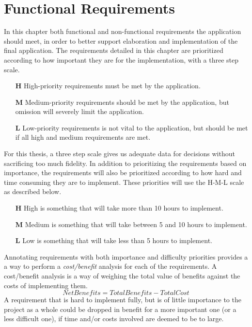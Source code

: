 \chapter{Functional Requirements}
\label{cha:funcreq}
In this chapter both functional and non-functional requirements the application should meet, in order to better support elaboration and implementation of the final application. 
The requirements detailed in this chapter are prioritized according to how important they are for the implementation, with a three step scale. 

\vspace{0.5cm}
\begin{itemize}
    \item[\textbf{H}]{High-priority requirements must be met by the application.} 
    \item[\textbf{M}]{Medium-priority requirements should be met by the application, but omission will severely limit the application.}
    \item[\textbf{L}]{Low-priority requirements is not vital to the application, but should be met if all high and medium requirements are met.}
\end{itemize}
\vspace{0.5cm}

For this thesis, a three step scale gives us adequate data for decisions without sacrificing too much fidelity.
In addition to prioritizing the requirements based on importance, the requirements will also be prioritized according to how hard and time consuming they are to implement. These priorities will use the H-M-L scale as described below. 

\vspace{0.5cm}
\begin{itemize}
    \item[\textbf{H}]{High is something that will take more than 10 hours to implement.}
    \item[\textbf{M}]{Medium is something that will take between 5 and 10 hours to implement.}
    \item[\textbf{L}]{Low is something that will take less than 5 hours to implement.}
\end{itemize}
\vspace{0.5cm}
Annotating requirements with both importance and difficulty priorities provides a a way to perform a \emph{cost/benefit} analysis for each of the requirements. A cost/benefit analysis is a way of weighing the total value of benefits against the costs of implementing them\cite{cellini2010cost}.
\begin{equation}
Net Benefits = Total Benefits - Total Cost
\end{equation}
A requirement that is hard to implement fully, but is of little importance to the project as a whole could be dropped in benefit for a more important one (or a less difficult one), if time and/or costs involved are deemed to be to large.

